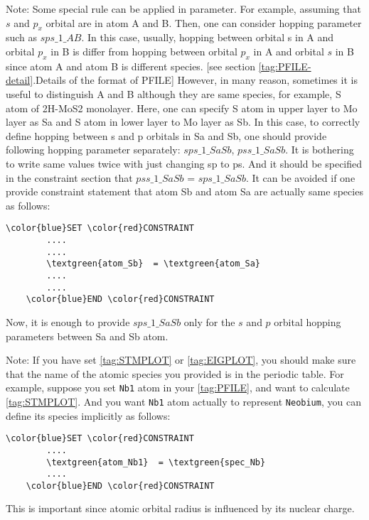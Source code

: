 \documentclass[a4paper,12pt]{scrartcl}
\newcommand{\textgreen}[1]{\textcolor{green!50!black}{\texttt{#1}}}
\begin{document}
\begin{description}
 Note: Some special rule can be applied in parameter.
 For example, assuming that $s$ and $p_x$ orbital are in atom A and B.
 Then, one can consider hopping parameter such as $sps\_1\_AB$.
 In this case, usually, hopping between orbital s in A and orbital $p_x$ in B 
 is differ from hopping between orbital $p_x$ in A and orbital $s$ in B since 
 atom A and atom B is different species. [see section \ref{tag:PFILE-detail}.Details of the format of PFILE]
 However, in many reason, sometimes it is useful to distinguish A and B although they are same species, for example, S atom of 2H-MoS2 monolayer. Here, one can specify S atom in upper layer to Mo layer  as Sa and S atom in lower layer to Mo layer as Sb. In this case, to correctly define hopping between s and p orbitals in Sa and Sb, one should provide following hopping parameter separately: $sps\_1\_SaSb$, $pss\_1\_SaSb$. It is bothering to write same values twice with just changing sp to ps. And it should be specified in the constraint section that $pss\_1\_SaSb$ = $sps\_1\_SaSb$. It can be avoided if one provide constraint statement that atom Sb and atom Sa are actually same species as follows:
 \begin{Verbatim}[commandchars=\\\{\},gobble=4, frame=single, framesep=2mm, 
    label= CONSTRAINT setup example,
    labelposition=bottomline]
    \color{blue}SET \color{red}CONSTRAINT
        ....
        ....
        \textgreen{atom_Sb}  = \textgreen{atom_Sa}
        ....
        ....
    \color{blue}END \color{red}CONSTRAINT
 \end{Verbatim}
  Now, it is enough to provide $sps\_1\_SaSb$ only for the $s$ and $p$ orbital hopping parameters between Sa and Sb atom.
  
  Note: If you have set \ref{tag:STMPLOT} or \ref{tag:EIGPLOT}, you should make sure that the name of the atomic species you provided is in the periodic table. For example, suppose you set \texttt{Nb1} atom in your \ref{tag:PFILE}, and want to calculate \ref{tag:STMPLOT}. And you want \texttt{Nb1} atom actually to represent \texttt{Neobium}, you can define its species implicitly as follows:
  
  \begin{Verbatim}[commandchars=\\\{\},gobble=4, frame=single, framesep=2mm, 
    label= CONSTRAINT setup example,
    labelposition=bottomline]
    \color{blue}SET \color{red}CONSTRAINT
        ....
        \textgreen{atom_Nb1}  = \textgreen{spec_Nb}
        ....
    \color{blue}END \color{red}CONSTRAINT
 \end{Verbatim}
 		This is important since atomic orbital radius is influenced by its nuclear charge.
 		




\end{description}
\end{document}
